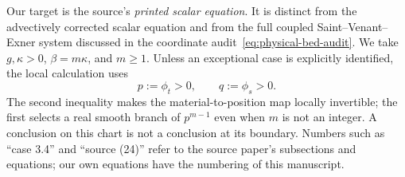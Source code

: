 \documentclass[11pt]{article}
\theoremstyle{definition}
\begin{document}
Our target is the source's \emph{printed scalar equation}. It is distinct
from the advectively corrected scalar equation and from the full coupled
Saint--Venant--Exner system discussed in the coordinate audit~\eqref{eq:physical-bed-audit}.
We take $g,\kappa>0$, $\beta=m\kappa$, and $m\geq1$. Unless an exceptional
case is explicitly identified, the local calculation uses
\begin{equation}
 p:=\phi_t>0,\qquad q:=\phi_s>0.
 \label{eq:sve-repro-chart}
\end{equation}
The second inequality makes the material-to-position map locally invertible;
the first selects a real smooth branch of $p^{m-1}$ even when $m$ is not an
integer. A conclusion on this chart is not a conclusion at its boundary.
Numbers such as ``case 3.4'' and ``source (24)'' refer to the source paper's
subsections and equations; our own equations have the numbering of this manuscript.
\end{document}
